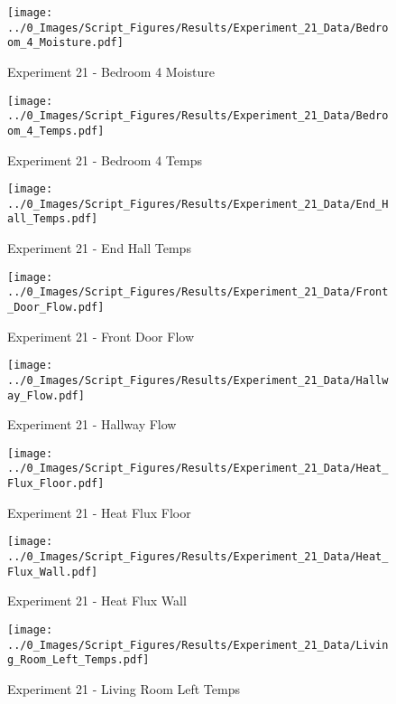 	\clearpage

	\begin{figure}[H]
		\centering
		\texttt{[image: ../0\_Images/Script\_Figures/Results/Experiment\_21\_Data/Bedroom\_4\_Moisture.pdf]}
		\caption[]{Experiment 21 - Bedroom 4 Moisture}
	\end{figure}
 

	\begin{figure}[H]
		\centering
		\texttt{[image: ../0\_Images/Script\_Figures/Results/Experiment\_21\_Data/Bedroom\_4\_Temps.pdf]}
		\caption[]{Experiment 21 - Bedroom 4 Temps}
	\end{figure}
 
	\clearpage

	\begin{figure}[H]
		\centering
		\texttt{[image: ../0\_Images/Script\_Figures/Results/Experiment\_21\_Data/End\_Hall\_Temps.pdf]}
		\caption[]{Experiment 21 - End Hall Temps}
	\end{figure}
 

	\begin{figure}[H]
		\centering
		\texttt{[image: ../0\_Images/Script\_Figures/Results/Experiment\_21\_Data/Front\_Door\_Flow.pdf]}
		\caption[]{Experiment 21 - Front Door Flow}
	\end{figure}
 
	\clearpage

	\begin{figure}[H]
		\centering
		\texttt{[image: ../0\_Images/Script\_Figures/Results/Experiment\_21\_Data/Hallway\_Flow.pdf]}
		\caption[]{Experiment 21 - Hallway Flow}
	\end{figure}
 

	\begin{figure}[H]
		\centering
		\texttt{[image: ../0\_Images/Script\_Figures/Results/Experiment\_21\_Data/Heat\_Flux\_Floor.pdf]}
		\caption[]{Experiment 21 - Heat Flux Floor}
	\end{figure}
 
	\clearpage

	\begin{figure}[H]
		\centering
		\texttt{[image: ../0\_Images/Script\_Figures/Results/Experiment\_21\_Data/Heat\_Flux\_Wall.pdf]}
		\caption[]{Experiment 21 - Heat Flux Wall}
	\end{figure}
 

	\begin{figure}[H]
		\centering
		\texttt{[image: ../0\_Images/Script\_Figures/Results/Experiment\_21\_Data/Living\_Room\_Left\_Temps.pdf]}
		\caption[]{Experiment 21 - Living Room Left Temps}
	\end{figure}
 
